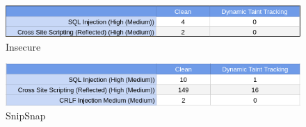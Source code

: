 \begin{figure}[!h]
	\centering
	\includegraphics[width=\textwidth]{images/Insecure.png}
	\caption{Insecure}
	\label{fig:Insecure}
\end{figure}

\begin{figure}[!h]
	\centering
	\includegraphics[width=\textwidth]{images/SnipSnap.png}
	\caption{SnipSnap}
	\label{fig:SnipSnap}
\end{figure}
